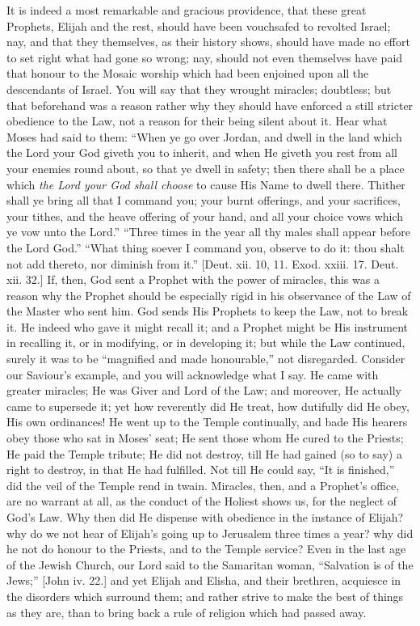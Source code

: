 It is indeed a most remarkable and gracious providence, that these
great Prophets, Elijah and the rest, should have been vouchsafed to
revolted Israel; nay, and that they themselves, as their history
shows, should have made no effort to set right what had gone so wrong;
nay, should not even themselves have paid that honour to the Mosaic
worship which had been enjoined upon all the descendants of Israel.
You will say that they wrought miracles; doubtless; but that
beforehand was a reason rather why they should have enforced a still
stricter obedience to the Law, not a reason for their being silent
about it. Hear what Moses had said to them: ``When ye go over
Jordan, and dwell in the land which the Lord your God giveth you to
inherit, and when He giveth you rest from all your enemies round
about, so that ye dwell in safety; then there shall be a place which \emph{the
Lord your God shall choose} to cause His Name to dwell there.
Thither shall ye bring all that I command you; your burnt offerings,
and your sacrifices, your tithes, and the heave offering of your hand,
and all your choice vows which ye vow unto the Lord.'' ``Three
times in the year all thy males shall appear before the Lord
God.'' ``What thing soever I command you, observe to do it:
thou shalt not add thereto, nor diminish from it.'' [Deut. xii.
10, 11. Exod. xxiii. 17. Deut. xii. 32.] If, then, God sent a Prophet
with the power of miracles, this was a reason why the Prophet should
be especially rigid in his observance of the Law of the Master who
sent him. God sends His Prophets to keep the Law, not to break it. He
indeed who gave it might recall it; and a Prophet might be His
instrument in recalling it, or in modifying, or in developing it; but
while the Law continued, surely it was to be ``magnified and made
honourable,'' not disregarded. Consider our Saviour's example, and
you will acknowledge what I say. He came with greater miracles; He was
Giver and Lord of the Law; and moreover, He actually came to supersede
it; yet how reverently did He treat, how dutifully did He obey, His
own ordinances! He went up to the Temple continually, and bade His
hearers obey those who sat in Moses' seat; He sent those whom He cured
to the Priests; He paid the Temple tribute; He did not destroy, till
He had gained (so to say) a right to destroy, in that He had
fulfilled. Not till He could say, ``It is finished,'' did the
veil of the Temple rend in twain. Miracles, then, and a Prophet's
office, are no warrant at all, as the conduct of the Holiest shows us,
for the neglect of God's Law. Why then did He dispense with obedience
in the instance of Elijah? why do we not hear of Elijah's going up to
Jerusalem three times a year? why did he not do honour to the Priests,
and to the Temple service? Even in the last age of the Jewish Church,
our Lord said to the Samaritan woman, ``Salvation is of the
Jews;'' [John iv. 22.] and yet Elijah and Elisha, and their
brethren, acquiesce in the disorders which surround them; and rather
strive to make the best of things as they are, than to bring back a
rule of religion which had passed away.

